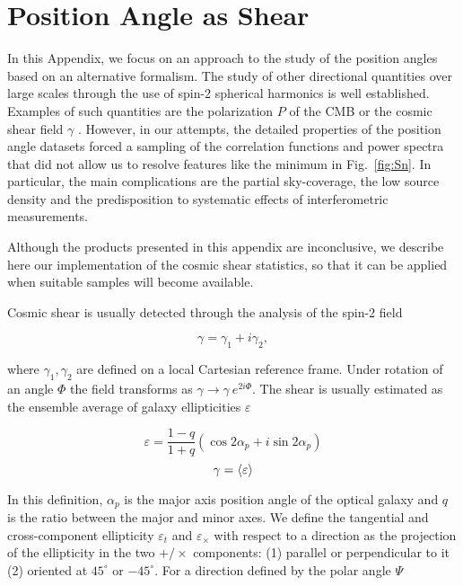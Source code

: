 	\section{Position Angle as Shear}
		\label{sec:shear}
		In this Appendix, we focus on an approach to the study of the position angles based on an alternative formalism. The study of other directional quantities over large scales through the use of spin-2 spherical harmonics is well established. Examples of such quantities are the polarization $P$ of the CMB or the cosmic shear field $\gamma$ \citep[e.g.,][]{Collaboration2015, Hikage2011}. However, in our attempts, the detailed properties of the position angle datasets forced a sampling of the correlation functions and power spectra that did not allow us to resolve features like the minimum in Fig.~\ref{fig:Sn}.  In particular, the main complications are the partial sky-coverage, the low source density and the predisposition to systematic effects of interferometric measurements.
		
		Although the products presented in this appendix are inconclusive, we describe here our implementation of the cosmic shear statistics, so that it can be applied when suitable samples will become available.
		
		Cosmic shear is usually detected through the analysis of the spin-2 field
		
		\begin{equation}
			\gamma = \gamma_1 + i\gamma_2,
			\label{eq:gamma}
		\end{equation}
		
		where $\gamma_1, \gamma_2$ are defined on a local Cartesian reference frame. Under rotation of an angle $\Phi$ the field transforms as $\gamma\to \gamma~e^{2i\Phi}$. The shear is usually estimated as the ensemble average of galaxy ellipticities $\varepsilon$ \citep{Kirk2015}
		
		\begin{equation}
			\varepsilon =  \frac{1-q}{1+q} (\cos 2\alpha_p + i \sin 2\alpha_p)
			\label{eq:epsi}
		\end{equation}
		\begin{equation}
			\gamma = \left\langle \varepsilon \right\rangle
		\end{equation}
		
		In this definition, $\alpha_p$ is the major axis position angle of the optical galaxy and $q$ is the ratio between the major and minor axes. We define the tangential and cross-component ellipticity $\varepsilon_t$ and $\varepsilon_\times$ with respect to a direction as the projection of the ellipticity in the two  $+/\times$ components: (1) parallel or perpendicular to it (2) oriented at $45^\circ$ or $-45^\circ$. For a direction defined by the polar angle $\Psi$
		
